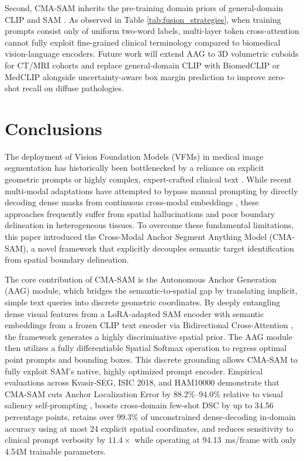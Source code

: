 \documentclass[onecolumn]{IEEEtran}
\numberwithin{equation}{section}
\theoremstyle{definition}
\theoremstyle{remark}
\begin{document}
Second, CMA-SAM inherits the pre-training domain priors of general-domain CLIP \cite{radford2021learning} and SAM \cite{kirillov2023segment, bommasani2022opportunities, lee2024foundation}. As observed in Table \ref{tab:fusion_strategies}, when training prompts consist only of uniform two-word labels, multi-layer token cross-attention cannot fully exploit fine-grained clinical terminology compared to biomedical vision-language encoders. Future work will extend AAG to 3D volumetric cuboids for CT/MRI cohorts \cite{konya2020ct} and replace general-domain CLIP with BiomedCLIP \cite{zhang2025biomedclip} or MedCLIP \cite{wang2022medclip} alongside uncertainty-aware box margin prediction to improve zero-shot recall on diffuse pathologies.

\section{Conclusions}

The deployment of Vision Foundation Models (VFMs) in medical image segmentation has historically been bottlenecked by a reliance on explicit geometric prompts \cite{kirillov2023segment, mazurowski2023segment} or highly complex, expert-crafted clinical text \cite{wang2022medclip}. While recent multi-modal adaptations have attempted to bypass manual prompting by directly decoding dense masks from continuous cross-modal embeddings \cite{qian2024simplevilmedsam, koleilat2025medclip}, these approaches frequently suffer from spatial hallucinations and poor boundary delineation in heterogeneous tissues. To overcome these fundamental limitations, this paper introduced the Cross-Modal Anchor Segment Anything Model (CMA-SAM), a novel framework that explicitly decouples semantic target identification from spatial boundary delineation.

The core contribution of CMA-SAM is the Autonomous Anchor Generation (AAG) module, which bridges the semantic-to-spatial gap by translating implicit, simple text queries into discrete geometric coordinates. By deeply entangling dense visual features from a LoRA-adapted SAM encoder \cite{zhang2023customized} with semantic embeddings from a frozen CLIP text encoder \cite{radford2021learning} via Bidirectional Cross-Attention \cite{wang2024sam}, the framework generates a highly discriminative spatial prior. The AAG module then utilizes a fully differentiable Spatial Softmax operation to regress optimal point prompts and bounding boxes. This discrete grounding allows CMA-SAM to fully exploit SAM's native, highly optimized prompt encoder. Empirical evaluations across Kvasir-SEG, ISIC 2018, and HAM10000 demonstrate that CMA-SAM cuts Anchor Localization Error by 88.2\%--94.0\% relative to visual saliency self-prompting \cite{xie2025self, chen2024un}, boosts cross-domain few-shot DSC by up to 34.56 percentage points, retains over 99.3\% of unconstrained dense-decoding in-domain accuracy \cite{qian2024simplevilmedsam} using at most 24 explicit spatial coordinates, and reduces sensitivity to clinical prompt verbosity by $11.4\times$ while operating at 94.13~ms/frame with only 4.54M trainable parameters.
\end{document}
